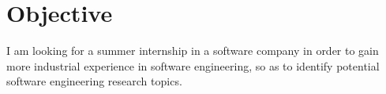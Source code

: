 
\section{Objective}
I am looking for a summer internship in a software company in order to gain more industrial experience in software engineering, so as to identify potential software engineering research topics.
